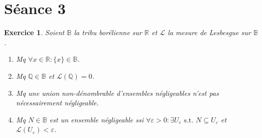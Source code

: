 \documentclass{article}
\newtheorem{ex}{Exercice}[section]
\newcommand{\st}{\text{ s.t. }}
\newcommand{\Q}{{\mathbb Q}}
\newcommand{\R}{{\mathbb R}}
\newcommand{\B}{{\mathbb B}}
\begin{document}
\newpage
\section{Séance 3}
\begin{ex} Soient $\B$ la tribu borélienne sur $\R$ et $\mathcal L$ la mesure de Lesbesgue sur $\B$.
\begin{enumerate}
	\item Mq $\forall x \in \R : \{x\} \in \B$.
	\item Mq $\Q \in \B$ et $\mathcal L(\Q) = 0$.
	\item Mq une union non-dénombrable d'ensembles négligeables n'est pas nécessairement négligeable.
	\item Mq $N \in \B$ est un ensemble négligeable ssi $\forall \varepsilon > 0 : \exists U_\varepsilon \st N \subseteq U_\varepsilon$ et $\mathcal L(U_\varepsilon) < \varepsilon$.
\end{enumerate}
\end{ex}
\end{document}
